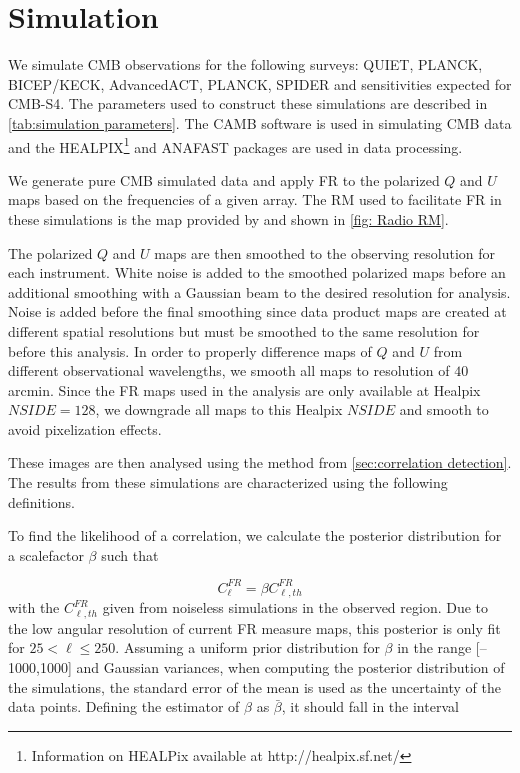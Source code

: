 \documentclass[usenatbib,hidelinks]{mnras}
\begin{document}
\section{Simulation}\label{sec:simulation}{
We simulate CMB observations for the following surveys: QUIET, PLANCK, BICEP/KECK, AdvancedACT, PLANCK, SPIDER and sensitivities expected for CMB-S4. The parameters used to construct these simulations are described in \autoref{tab:simulation parameters}.
The {\scriptsize CAMB} software is used in simulating CMB data \citep{Lewis:1999bs, Howlett:2012mh} and the {\scriptsize HEALPIX}\footnote{Information on HEALPix available at http://healpix.sf.net/} \citep{gorski_et_al2005} and {\scriptsize ANAFAST} packages are used in data processing.

We generate pure CMB simulated data and apply FR to the polarized $Q$ and $U$ maps based on the frequencies of a given array.
The RM used to facilitate FR in these simulations is the map provided by \cite{Oppermann:2014} and shown in \autoref{fig: Radio RM}.%

The polarized $Q$ and $U$ maps are then smoothed to the observing 
resolution for each instrument.
White noise is added to the smoothed polarized maps before an additional smoothing with a Gaussian beam to the desired resolution for analysis.
Noise is added before the final smoothing since data product maps are created at different spatial resolutions but must be smoothed 
to the same resolution for before this analysis. 
In order to properly difference maps of $Q$ and $U$ from different 
observational wavelengths, we smooth all maps to resolution of
$40$arcmin. Since the FR maps used in the analysis are 
only available at Healpix $NSIDE=128$, we downgrade all maps
to this Healpix $NSIDE$ and smooth to avoid pixelization effects.


 These images are then analysed using the method from \autoref{sec:correlation detection}. The results from these simulations are characterized using the following definitions.




To find the likelihood of a correlation, we calculate the posterior distribution for a scalefactor $\beta$ such that

\begin{equation}
C_{\ell}^{FR} = \beta C_{\ell,th}^{FR}  \label{eqn:beta-cl}
\end{equation}
with the $C_{\ell,th}^{FR}$ given from noiseless simulations in the observed region. Due to the low angular resolution of current FR measure maps, this posterior is only fit for $25 < \ell \leq 250$. Assuming a uniform prior distribution for $\beta$ in the range [--1000,1000] and Gaussian variances, when computing the posterior distribution of the simulations, the standard error of the mean is used as the uncertainty of the data points. Defining the estimator of $\beta$ as $\bar{\beta}$, it should fall in the interval

}
\end{document}
